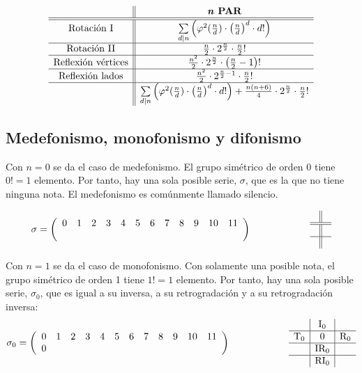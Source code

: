 		\[\begin{array}{c||c}
		&\textbf{\textit{n} PAR}\\\hline\hline
		\mbox{Rotación I}&\sum\limits_{d|n}\left(\varphi^2(\frac{n}{d})\cdot\left(\frac{n}{d}\right)^d\cdot d!\right)\\\hline
		\mbox{Rotación II}&\frac{n}{2}\cdot2^{\frac{n}{2}}\cdot\frac{n}{2}!\\\hline
		\mbox{Reflexión vértices}&\frac{n^2}{2}\cdot2^{\frac{n}{2}}\cdot\left(\frac{n}{2}-1\right)!\\\hline
		\mbox{Reflexión lados}&\frac{n^2}{2}\cdot2^{\frac{n}{2}-1}\cdot\frac{n}{2}!\\\hline
		&\sum\limits_{d|n}\left(\varphi^2(\frac{n}{d})\cdot\left(\frac{n}{d}\right)^d\cdot d!\right)+\frac{n(n+6)}{4}\cdot2^{\frac{n}{2}}\cdot\frac{n}{2}!\\
		\end{array}\]
		\def\arraystretch{1}
		
	\subsection{Medefonismo, monofonismo y difonismo}
	\label{monodi}
		Con $n=0$ se da el caso de medefonismo. El grupo simétrico de orden 0 tiene $0!=1$ elemento. Por tanto, hay una sola posible serie, $\sigma$, que es la que no tiene ninguna nota. El medefonismo es comúnmente llamado silencio.
		
		\[\sigma=\drow{}
		\qquad\qquad\qquad
		\begin{array}{l||r}
		&\\
		\hline
		\hline
		&\\
		\hline
		&
		\end{array}\]
	
		Con $n=1$ se da el caso de monofonismo. Con solamente una posible nota, el grupo simétrico de orden 1 tiene $1!=1$ elemento. Por tanto, hay una sola posible serie, $\sigma_0$, que es igual a su inversa, a su retrogradación y a su retrogradación inversa:
		\[\sigma_0=\drow{0}
		\qquad\qquad\qquad
		\begin{array}{l|c|r}
			&\mbox{I}_{0}&\\
			\hline
			\mbox{T}_{0}&0&\mbox{R}_{0}\\
			\hline
			&\mbox{IR}_{0}&\\
			\hline
			&\mbox{RI}_{0}&
		\end{array}\]
	
